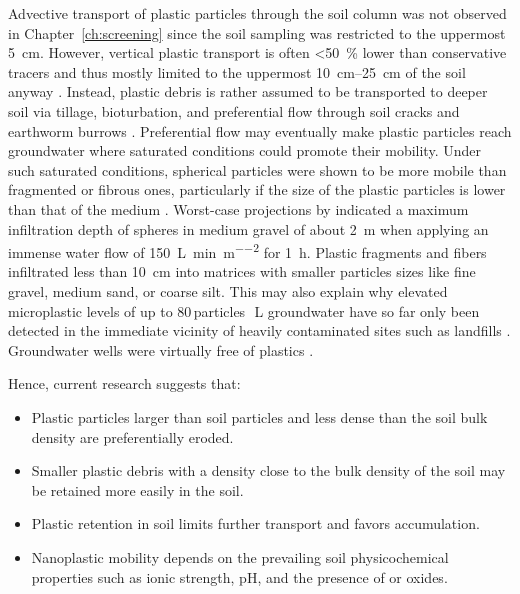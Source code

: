 Advective transport of plastic particles through the soil column was not observed in Chapter~\ref{ch:screening} since the soil sampling was restricted to the uppermost \SI{5}{\centi\meter}. However, vertical plastic transport is often \SI{<50}{\percent} lower than conservative tracers and thus mostly limited to the uppermost \SIrange{10}{25}{\centi\meter} of the soil anyway \citep{KellerTransport2020,WuTransport2020}. Instead, plastic debris is rather assumed to be transported to deeper soil via tillage, bioturbation, and preferential flow through soil cracks and earthworm burrows \citep{RilligMicroplastic2017a,YuLeaching2019,LiVertical2021}. Preferential flow may eventually make plastic particles reach groundwater where saturated conditions could promote their mobility. Under such saturated conditions, spherical particles were shown to be more mobile than fragmented or fibrous ones, particularly if the size of the plastic particles is lower than that of the medium \citep{WaldschlagerInfiltration2020}. Worst-case projections by \citet{WaldschlagerInfiltration2020} indicated a maximum infiltration depth of spheres in medium gravel of about \SI{2}{\meter} when applying an immense water flow of \SI{150}{\liter\per\minute\per\square\meter} for \SI{1}{\hour}. Plastic fragments and fibers infiltrated less than \SI{10}{\centi\meter} into matrices with smaller particles sizes like fine gravel, medium sand, or coarse silt.
This may also explain why elevated microplastic levels of up to \num{80}\,particles\,\si{\per\liter} groundwater have so far only been detected in the immediate vicinity of heavily contaminated sites such as landfills \citep{ManikandaBharathSpatial2021}. Groundwater wells were virtually free of plastics \citep{MintenigLow2019}.

Hence, current research suggests that:

\begin{itemize}
	\item Plastic particles larger than soil particles and less dense than the soil bulk density are preferentially eroded.
	\item Smaller plastic debris with a density close to the bulk density of the soil may be retained more easily in the soil.
	\item Plastic retention in soil limits further transport and favors accumulation.
	\item Nanoplastic mobility depends on the prevailing soil physicochemical properties such as ionic strength, pH, and the presence of  or  oxides.
\end{itemize}

